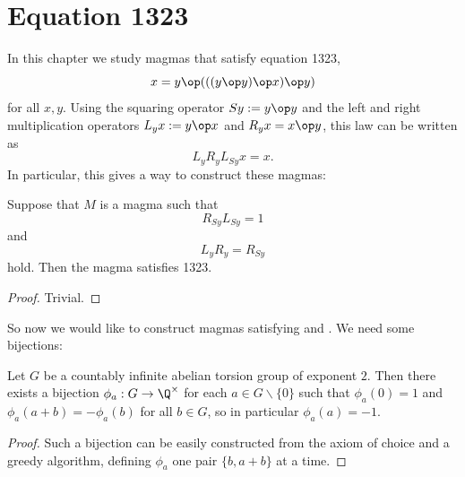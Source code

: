 
\chapter{Equation 1323}\label{1323-chapter}

In this chapter we study magmas that satisfy equation 1323,
\begin{equation}\label{1323}
  x = y \op (((y \op y) \op x) \op y)
\end{equation}
for all $x,y$.  Using the squaring operator $Sy := y \op y$ and the left and right multiplication operators $L_y x := y \op x$ and $R_y x = x \op y$, this law can be written as
$$ L_y R_y L_{Sy} x = x.$$
In particular, this gives a way to construct these magmas:

\begin{lemma}\label{1323-construct}\leanok{}  Suppose that $M$ is a magma such that
  \begin{equation}\label{lr}
    R_{Sy} L_{Sy} = 1
   \end{equation}
and
\begin{equation}\label{lr-simp}
  L_{y} R_{y} = R_{Sy}
\end{equation}
hold.  Then the magma satisfies 1323.
\end{lemma}

\begin{proof} Trivial.
\end{proof}

 So now we would like to construct magmas satisfying  and .  We need some bijections:

 \begin{lemma}[Bijections]\label{bij}\leanok{}
  Let $G$ be a countably infinite abelian torsion group of exponent $2$.  Then there exists a bijection $\phi_a: G \to \Q^\times$ for each $a \in G \backslash \{0\}$ such that
 $\phi_a(0) = 1$ and $\phi_a(a+b) = -\phi_a(b)$ for all $b \in G$, so in particular $\phi_a(a)=-1$.
 \end{lemma}

 \begin{proof}
  Such a bijection can be easily constructed from the axiom of choice and a greedy algorithm, defining $\phi_a$ one pair $\{b,a+b\}$ at a time.
 \end{proof}


